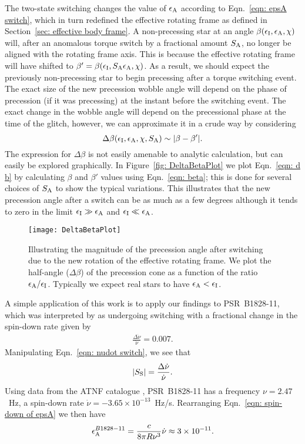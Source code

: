 \documentclass[../full_thesis/full_thesis.tex]{subfiles}
\begin{document}
The two-state switching changes the value of $\epsilon_{\mathrm{A}}$ according to
Eqn.~\eqref{eqn: epsA switch}, which in turn redefined the effective rotating frame
as defined in Section~\ref{sec: effective body frame}. A non-precessing star at an
angle $\beta(\epsilon_{\mathrm{I}}, \epsilon_{\mathrm{A}}, \chi)$ will, after an anomalous torque switch by a fractional
amount $S_{\mathrm{A}}$, no longer be aligned with the rotating frame axis. This is
because the effective rotating frame will have shifted to $\beta' = \beta(\epsilon_{\mathrm{I}},
S_{\mathrm{A}}\epsilon_{\mathrm{A}}, \chi)$. As a result, we should expect the previously
non-precessing star to begin precessing after a torque switching event.
The exact size of the new precession wobble angle will depend on the phase of
precession (if it was precessing) at the instant before the switching event.
The exact change in the wobble angle will depend on the precessional phase at
the time of the glitch, however, we can approximate it in a crude way by considering
\begin{equation}
    \Delta\beta(\epsilon_{\mathrm{I}}, \epsilon_{\mathrm{A}}, \chi, S_{\mathrm{A}}) \sim |\beta - \beta'|.
\label{eqn: d b}
\end{equation}
The expression for $\Delta \beta$ is not easily amenable to analytic
calculation, but can easily be explored graphically. In Figure~\ref{fig:
DeltaBetaPlot} we plot Eqn.~\eqref{eqn: d b} by calculating $\beta$ and
$\beta'$ values using Eqn.~\eqref{eqn: beta}; this is done for several choices
of $S_{\mathrm{A}}$ to show the typical variations. This illustrates that the new
precession angle after a switch can be as much as a few degrees although it
tends to zero in the limit $\epsilon_{\mathrm{I}} \gg \epsilon_{\mathrm{A}}$ and $\epsilon_{\mathrm{I}} \ll \epsilon_{\mathrm{A}}$.
\begin{figure}[htb]
    \centering
    \texttt{[image: DeltaBetaPlot]}
    \caption{Illustrating the magnitude of the precession angle after switching
        due to the new rotation of the effective rotating frame. We plot the half-angle
        ($\Delta\beta$) of the precession cone as a function of the ratio
    $\epsilon_{\mathrm{A}}/\epsilon_{\mathrm{I}}$. Typically we expect real stars to have $\epsilon_{\mathrm{A}} < \epsilon_{\mathrm{I}}$.}
    \label{fig: DeltaBetaPlot}
\end{figure}

A simple application of this work is to apply our findings to PSR~B1828-11,
which was interpreted by \citet{Lyne2010} as undergoing switching with a fractional
change in the spin-down rate given by
\begin{align}
\frac{\Delta\dot{\nu}}{\dot{\nu}} = 0.007.
\end{align}
Manipulating Eqn.~\eqref{eqn: nudot switch}, we see that
\begin{align}
|S_{\mathrm{S}}| = \frac{\Delta\dot{\nu}}{\dot{\nu}}.
\end{align}
Using data from the ATNF catalogue \citep{ATNF}, PSR~B1828-11 has a frequency
$\nu = 2.47$~Hz, a spin-down rate $\dot{\nu}=-3.65\times10^{-13}$~Hz/s.
Rearranging Eqn.~\eqref{eqn: spin-down of epsA} we then have
\begin{align}
\epsilon_{\mathrm{A}}^{B1828-11} = \frac{c}{8\pi R\nu^{3}}\dot{\nu} \approx 3 \times 10^{-11}.
\end{align}
\end{document}

